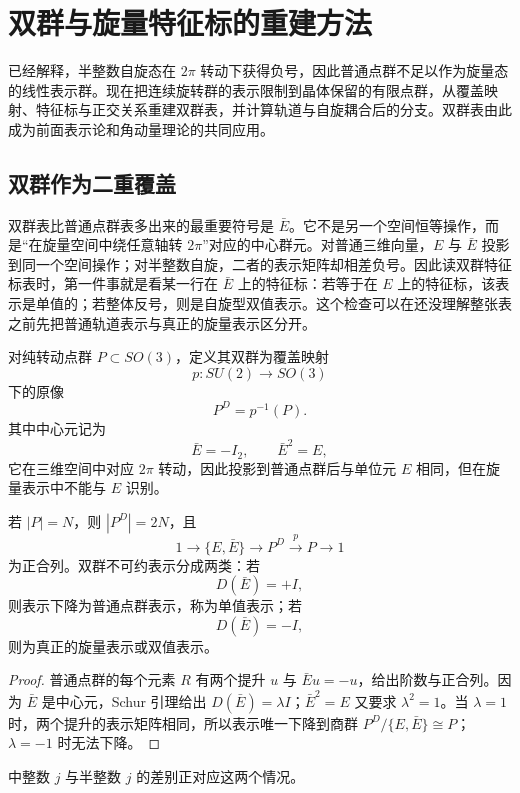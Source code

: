 \chapter{双群与旋量特征标的重建方法}
\label{app:double-groups}

已经解释，半整数自旋态在 $2\pi$ 转动下获得负号，因此普通点群不足以作为旋量态的线性表示群。现在把连续旋转群的表示限制到晶体保留的有限点群，从覆盖映射、特征标与正交关系重建双群表，并计算轨道与自旋耦合后的分支。双群表由此成为前面表示论和角动量理论的共同应用。

\section{双群作为二重覆盖}

双群表比普通点群表多出来的最重要符号是 $\bar E$。它不是另一个空间恒等操作，而是“在旋量空间中绕任意轴转 $2\pi$”对应的中心群元。对普通三维向量，$E$ 与 $\bar E$ 投影到同一个空间操作；对半整数自旋，二者的表示矩阵却相差负号。因此读双群特征标表时，第一件事就是看某一行在 $\bar E$ 上的特征标：若等于在 $E$ 上的特征标，该表示是单值的；若整体反号，则是自旋型双值表示。这个检查可以在还没理解整张表之前先把普通轨道表示与真正的旋量表示区分开。


\begin{definition}[纯转动点群的双群]
对纯转动点群 $P\subset SO(3)$，定义其双群为覆盖映射
\[
p:SU(2)\longrightarrow SO(3)
\]
下的原像
\begin{equation}
P^D=p^{-1}(P).
\label{eq:double-point-preimage}
\end{equation}
其中中心元记为
\[
\bar E=-I_2,
\qquad
\bar E^2=E,
\]
它在三维空间中对应 $2\pi$ 转动，因此投影到普通点群后与单位元 $E$ 相同，但在旋量表示中不能与 $E$ 识别。
\end{definition}

\begin{proposition}[双群的阶与不可约表示的中心符号]
若 $|P|=N$，则 $|P^D|=2N$，且
\[
1\longrightarrow\{E,\bar E\}\longrightarrow P^D
\overset{p}{\longrightarrow}P\longrightarrow1
\]
为正合列。双群不可约表示分成两类：若
\[
D(\bar E)=+I,
\]
则表示下降为普通点群表示，称为单值表示；若
\[
D(\bar E)=-I,
\]
则为真正的旋量表示或双值表示。
\end{proposition}
\begin{proof}
普通点群的每个元素 $R$ 有两个提升 $u$ 与 $\bar E u=-u$，给出阶数与正合列。因为 $\bar E$ 是中心元，Schur 引理给出 $D(\bar E)=\lambda I$；$\bar E^2=E$ 又要求 $\lambda^2=1$。当 $\lambda=1$ 时，两个提升的表示矩阵相同，所以表示唯一下降到商群 $P^D/\{E,\bar E\}\cong P$；$\lambda=-1$ 时无法下降。
\end{proof}
中整数 $j$ 与半整数 $j$ 的差别正对应这两个情况。

